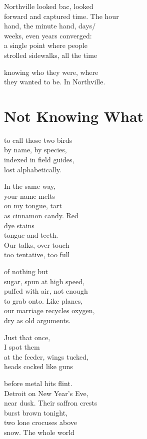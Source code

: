 \documentclass[twoside,10pt]{book}
\begin{document}
Northville looked bac, looked\\
forward and captured time. The hour\\
hand, the minute hand, days/\\
weeks, even years converged:\\
a single point where people\\
strolled sidewalks, all the time

knowing who they were, where\\
they wanted to be. In Northville.



\clearpage
\section{Not Knowing What}

to call those two birds\\
by name, by species,\\
indexed in field guides,\\
lost alphabetically.

In the same way,\\
your name melts\\
on my tongue, tart\\
as cinnamon candy. Red\\
dye stains\\
tongue and teeth.\\
Our talks, over touch\\
too tentative, too full

of nothing but\\
sugar, spun at high speed,\\
puffed with air, not enough\\
to grab onto. Like planes,\\
our marriage recycles oxygen,\\
dry as old arguments.

Just that once,\\
I spot them\\
at the feeder, wings tucked,\\
heads cocked like guns

before metal hits flint.\\
Detroit on New Year's Eve,\\
near dusk. Their saffron crests\\
burst brown tonight,\\
two lone crocuses above\\
snow. The whole world
\end{document}
